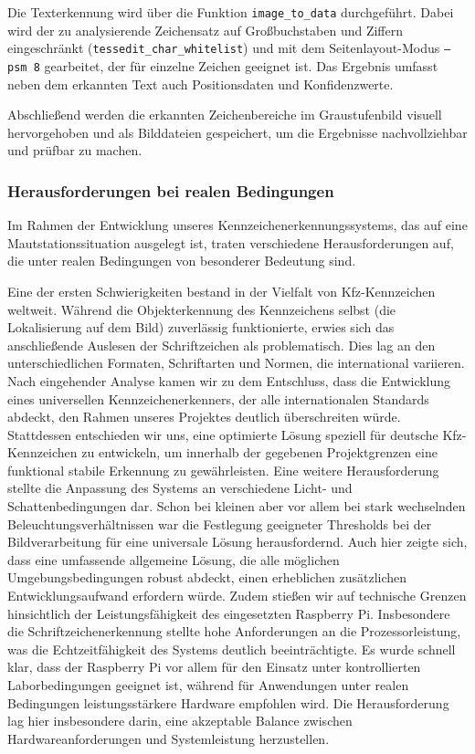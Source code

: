Die Texterkennung wird über die Funktion \texttt{image\_to\_data} durchgeführt. Dabei wird der zu analysierende Zeichensatz auf Großbuchstaben und Ziffern eingeschränkt (\texttt{tessedit\_char\_whitelist}) und mit dem Seitenlayout-Modus \texttt{--psm 8} gearbeitet, der für einzelne Zeichen geeignet ist. Das Ergebnis umfasst neben dem erkannten Text auch Positionsdaten und Konfidenzwerte.\singlespacing

Abschließend werden die erkannten Zeichenbereiche im Graustufenbild visuell hervorgehoben und als Bilddateien gespeichert, um die Ergebnisse nachvollziehbar und prüfbar zu machen.

\subsubsection{Herausforderungen bei realen Bedingungen}
Im Rahmen der Entwicklung unseres Kennzeichenerkennungssystems, das auf eine Mautstationssituation ausgelegt ist, traten verschiedene Herausforderungen auf, die unter realen Bedingungen von besonderer Bedeutung sind. \singlespacing

Eine der ersten Schwierigkeiten bestand in der Vielfalt von Kfz-Kennzeichen weltweit. 
Während die Objekterkennung des Kennzeichens selbst (die Lokalisierung auf dem Bild) zuverlässig funktionierte, erwies sich das anschließende Auslesen der Schriftzeichen als problematisch. 
 Dies lag an den unterschiedlichen Formaten, Schriftarten und Normen, die international variieren. 
 Nach eingehender Analyse kamen wir zu dem Entschluss, dass die Entwicklung eines universellen Kennzeichenerkenners, der alle internationalen Standards abdeckt, den Rahmen unseres Projektes deutlich überschreiten würde. 
 Stattdessen entschieden wir uns, eine optimierte Lösung speziell für deutsche Kfz-Kennzeichen zu entwickeln, um innerhalb der gegebenen Projektgrenzen eine funktional stabile Erkennung zu gewährleisten.\singlespacing
 Eine weitere Herausforderung stellte die Anpassung des Systems an verschiedene Licht- und Schattenbedingungen dar. 
 Schon bei kleinen aber vor allem bei stark wechselnden Beleuchtungsverhältnissen war die Festlegung geeigneter Thresholds bei der Bildverarbeitung für eine universale Lösung herausfordernd. 
 Auch hier zeigte sich, dass eine umfassende allgemeine Lösung, die alle möglichen Umgebungsbedingungen robust abdeckt, einen erheblichen zusätzlichen Entwicklungsaufwand erfordern würde. \singlespacing
 Zudem stießen wir auf technische Grenzen hinsichtlich der Leistungsfähigkeit des eingesetzten Raspberry Pi.
Insbesondere die Schriftzeichenerkennung stellte hohe Anforderungen an die Prozessorleistung, was die Echtzeitfähigkeit des Systems deutlich beeinträchtigte.
Es wurde schnell klar, dass der Raspberry Pi vor allem für den Einsatz unter kontrollierten Laborbedingungen geeignet ist, während für Anwendungen unter realen Bedingungen leistungsstärkere Hardware empfohlen wird.
Die Herausforderung lag hier insbesondere darin, eine akzeptable Balance zwischen Hardwareanforderungen und Systemleistung herzustellen.\singlespacing

